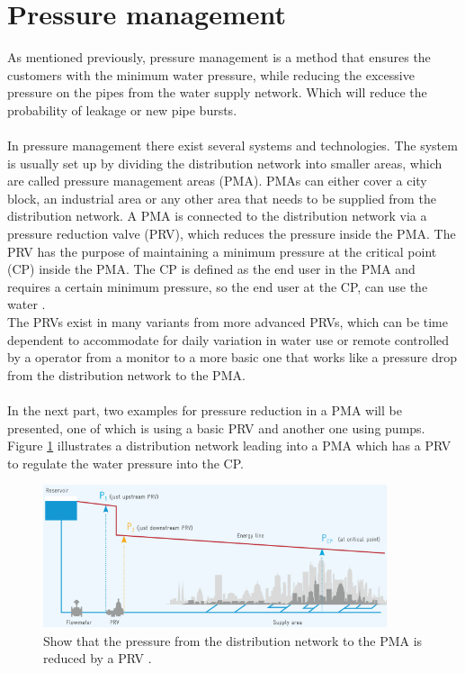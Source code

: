 \section{Pressure management}
\label{sec:pressure_management}
As mentioned previously, pressure management is a method that ensures the customers with the minimum water pressure, while reducing the excessive pressure on the pipes from the water supply network. Which will reduce the probability of leakage or new pipe bursts.
\\
\\
In pressure management there exist several systems and technologies. The system is usually set up by dividing the distribution network into smaller areas, which are called pressure management areas (PMA). PMAs can either cover a city block, an industrial area or any other area that needs to be supplied from the distribution network. A PMA is connected to the distribution network via a pressure reduction valve (PRV), which reduces the pressure inside the PMA. The PRV has the purpose of maintaining a minimum pressure at the critical point (CP) inside the PMA. The CP is defined as the end user in the PMA and requires a certain minimum pressure, so the end user at the CP, can use the water \cite{guidelines_waterloss}.   
\\
The PRVs exist in many variants from more advanced PRVs, which can be time dependent to accommodate for daily variation in water use or remote controlled by a operator from a monitor to a more basic one that works like a pressure drop from the distribution network to the PMA.
\\
\\
In the next part, two examples for pressure reduction in a PMA will be presented, one of which is using a basic PRV and another one using pumps. 
\\
Figure \ref{fig:prv} illustrates a distribution network leading into a PMA which has a PRV to regulate the water pressure into the CP.  
\begin{figure}[H]
\centering
\includegraphics[width=0.9\textwidth]{report/introduction/pictures/PRV.png}
\caption{ Show that the pressure from the distribution network to the PMA is reduced by a PRV \cite{guidelines_waterloss}.}
\label{fig:prv}
\end{figure}

